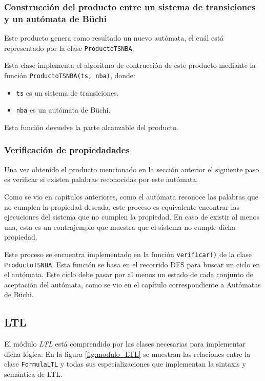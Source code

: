 \subsubsection{Construcción del producto entre un sistema de transiciones y un autómata de Büchi}
Este producto genera como resultado un nuevo autómata, el cuál está representado
 por la clase \texttt{ProductoTSNBA}.

Esta clase implementa el algoritmo de contrucción de este producto mediante
 la función \texttt{ProductoTSNBA(ts, nba)}, donde:
\begin{itemize}
\item \texttt{ts} es un sistema de transiciones.
\item \texttt{nba} es un autómata de Büchi.
\end{itemize}

Esta función devuelve la parte alcanzable del producto.

\subsubsection{Verificación de propiedadades}
Una vez obtenido el producto mencionado en la sección anterior el siguiente paso
 es verificar si existen palabras reconocidas por este autómata.

Como se vio en capítulos anteriores, como el autómata reconoce las palabras que no cumplen
 la propiedad deseada, este proceso es equivalente encontrar las ejecuciones del sistema
 que no cumplen la propiedad.
En caso de existir al menos una, esta es un contrajemplo que muestra que el sistema no
 cumple dicha propiedad.

Este proceso se encuentra implementado en la función \texttt{verificar()} de la clase
 \texttt{ProductoTSNBA}.
Esta función se basa en el recorrido DFS para buscar un ciclo en el autómata.
Este ciclo debe pasar por al menos un estado de cada conjunto de aceptación del
 autómata, como se vio en el capítulo correspondiente a Autómatas de Büchi.

\subsection{LTL}
El módulo \textit{LTL} está comprendido por las clases necesarias para implementar dicha
 lógica.
En la figura \ref{fig:modulo_LTL} se muestran las relaciones entre la clase \texttt{FormulaLTL}
 y todas sus especializaciones que implementan la sintaxis y semántica de LTL.

